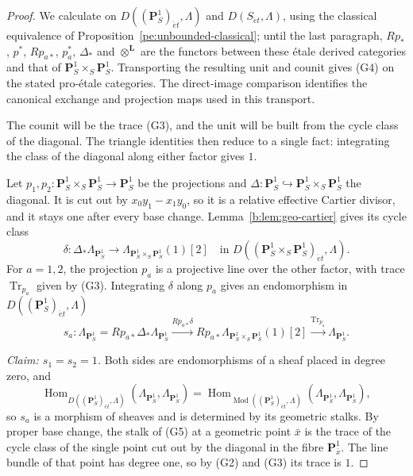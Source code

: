 \documentclass[11pt,a4paper]{article}
\numberwithin{equation}{section}
\theoremstyle{definition}
\theoremstyle{remark}
\newcommand{\Mod}{\operatorname{Mod}}
\newcommand{\et}{\acute{e}t}
\newcommand{\Hom}{\operatorname{Hom}}
\begin{document}
\begin{proof}
We calculate on $D((\mathbf P^1_S)_{\et},\Lambda)$ and
$D(S_{\et},\Lambda)$, using the classical equivalence of
Proposition~\ref{pe:unbounded-classical}; until the last paragraph,
\(Rp_*\), \(p^*\), \(Rp_{a*}\), \(p_a^*\), \(\Delta_*\) and
\(\otimes^{\mathbf L}\) are the functors between these \'etale derived
categories and that of \(\mathbf P^1_S\times_S\mathbf P^1_S\).
Transporting the resulting unit and counit gives (G4) on the stated
pro-\'etale categories.
The direct-image comparison identifies the canonical exchange and
projection maps used in this transport.

The counit will be the trace (G3), and the unit will be built from the
cycle class of the diagonal. The triangle identities then reduce to a
single fact: integrating the class of the diagonal along either factor
gives \(1\).

Let \(p_1,p_2:\mathbf P^1_S\times_S\mathbf P^1_S\to\mathbf P^1_S\) be
the projections and
\(\Delta:\mathbf P^1_S\hookrightarrow\mathbf P^1_S\times_S\mathbf P^1_S\)
the diagonal. It is cut out by \(x_0y_1-x_1y_0\), so it is a relative
effective Cartier divisor, and it stays one after every base change.
Lemma~\ref{b:lem:geo-cartier} gives its cycle class
\[
 \delta:\Delta_*\Lambda_{\mathbf P^1_S}\longrightarrow
   \Lambda_{\mathbf P^1_S\times_S\mathbf P^1_S}(1)[2]
   \quad\text{in }D((\mathbf P^1_S\times_S\mathbf P^1_S)_{\et},\Lambda).
\]
For \(a=1,2\), the projection \(p_a\) is a projective line over the
other factor, with trace \(\operatorname{Tr}_{p_a}\) given by (G3).
Integrating \(\delta\) along \(p_a\) gives an endomorphism in
\(D((\mathbf P^1_S)_{\et},\Lambda)\)
\[
 s_a:\Lambda_{\mathbf P^1_S}=Rp_{a*}\Delta_*\Lambda_{\mathbf P^1_S}
       \xrightarrow{Rp_{a*}\delta}
       Rp_{a*}\Lambda_{\mathbf P^1_S\times_S\mathbf P^1_S}(1)[2]
       \xrightarrow{\operatorname{Tr}_{p_a}}\Lambda_{\mathbf P^1_S}.                 \tag{G5}
\]

\emph{Claim: \(s_1=s_2=1\).} Both sides are endomorphisms of a sheaf
placed in degree zero, and
\[
 \Hom_{D((\mathbf P^1_S)_{\et},\Lambda)}
      (\Lambda_{\mathbf P^1_S},\Lambda_{\mathbf P^1_S})
   =\Hom_{\Mod((\mathbf P^1_S)_{\et},\Lambda)}
                   (\Lambda_{\mathbf P^1_S},\Lambda_{\mathbf P^1_S}),
\]
so \(s_a\) is a morphism of sheaves and is determined by its geometric
stalks. By proper base change, the stalk of (G5) at a geometric point
\(\bar x\) is the trace of the cycle class of the single point cut out
by the diagonal in the fibre \(\mathbf P^1_{\bar x}\). The line bundle of
that point has degree one, so by (G2) and (G3) its trace is \(1\).


\end{proof}
\end{document}
